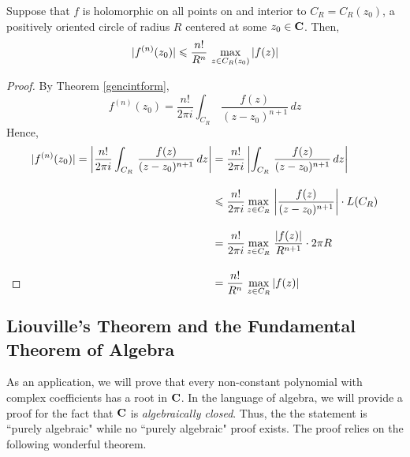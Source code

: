 \medskip

\begin{theorem}\label{cauchyineq}
Suppose that $f$ is holomorphic on all points on and interior to $C_R = C_R(z_0)$, a positively oriented circle of radius $R$ centered at some $z_0 \in \mathbf C$. Then,
\[|f^{(n)}(z_0)| \leqslant \frac{n!}{R^n}\,\max_{z \in C_R(z_0)}\left\lvert f(z)\right\rvert\]
\end{theorem}
\begin{proof}
By Theorem \ref{gencintform}, 
\[f^{(n)}(z_0) = \frac{n!}{2\pi i}\int_{C_R}\,\frac{f(z)}{(z - z_0)^{n+1}}\,dz\]
Hence, 
\begin{align*}
|f^{(n)}(z_0)|= \left\lvert\frac{n!}{2\pi i}\int_{C_R}\,\frac{f(z)}{(z - z_0)^{n+1}}\,dz\right\rvert &= \frac{n!}{2\pi i}\left\lvert\int_{C_R}\,\frac{f(z)}{(z - z_0)^{n+1}}\,dz\right\rvert\\[1em]
&\leqslant \frac{n!}{2\pi i}\max_{z \in C_R}\,\left\lvert\frac{f(z)}{(z - z_0)^{n+1}}\right\rvert\cdot L(C_R)\\[1em]
&= \frac{n!}{2\pi i}\max_{z \in C_R}\,\frac{\left\lvert f(z)\right\rvert}{R^{n+1}}\cdot 2\pi R\\[1em]
&= \frac{n!}{R^n}\,\max_{z \in C_R}\left\lvert f(z)\right\rvert\\[-2.5em]
\end{align*}
\end{proof}

\bigskip

\subsection{Liouville's Theorem and the Fundamental Theorem of Algebra}
As an application, we will prove that every non-constant polynomial with complex coefficients has a root in $\mathbf C$. In the language of algebra, we will provide a proof for the fact that $\mathbf C$ is \emph{algebraically closed}. Thus, the the statement is ``purely algebraic" while no ``purely algebraic" proof exists. The proof relies on the following wonderful theorem. 

\medskip

